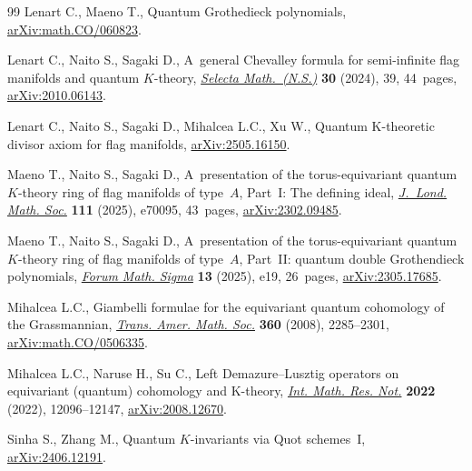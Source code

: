 \documentclass[pdftex]{sigma}
\numberwithin{equation}{section}
\theoremstyle{definition}
\begin{document}
\begin{thebibliography}{99}
Lenart C., Maeno T., Quantum {G}rothedieck polynomials,
 \href{http://arxiv.org/abs/math.CO/060823}{arXiv:math.CO/060823}.

Lenart C., Naito S., Sagaki D., A~general {C}hevalley formula for semi-infinite
 flag manifolds and quantum {$K$}-theory,
 \href{https://doi.org/10.1007/s00029-024-00924-8}{\textit{Selecta
 Math.~(N.S.)}} \textbf{30} (2024), 39, 44~pages,
 \href{http://arxiv.org/abs/2010.06143}{arXiv:2010.06143}.

Lenart C., Naito S., Sagaki D., Mihalcea L.C., Xu W., Quantum {K}-theoretic
 divisor axiom for flag manifolds,
 \href{http://arxiv.org/abs/2505.16150}{arXiv:2505.16150}.

Maeno T., Naito S., Sagaki D., A~presentation of the torus-equivariant quantum
 {$K$}-theory ring of flag manifolds of type~{$A$}, {P}art~{I}: {T}he defining
 ideal, \href{https://doi.org/10.1112/jlms.70095}{\textit{J.~Lond. Math.
 Soc.}} \textbf{111} (2025), e70095, 43~pages,
 \href{http://arxiv.org/abs/2302.09485}{arXiv:2302.09485}.

Maeno T., Naito S., Sagaki D., A~presentation of the torus-equivariant quantum
 {$K$}-theory ring of flag manifolds of type~{$A$}, {P}art~{II}: quantum
 double {G}rothendieck polynomials,
 \href{https://doi.org/10.1017/fms.2024.147}{\textit{Forum Math. Sigma}}
 \textbf{13} (2025), e19, 26~pages,
 \href{http://arxiv.org/abs/2305.17685}{arXiv:2305.17685}.

Mihalcea L.C., Giambelli formulae for the equivariant quantum cohomology of the
 {G}rassmannian,
 \href{https://doi.org/10.1090/S0002-9947-07-04245-6}{\textit{Trans. Amer.
 Math. Soc.}} \textbf{360} (2008), 2285--2301,
 \href{http://arxiv.org/abs/math.CO/0506335}{arXiv:math.CO/0506335}.

Mihalcea L.C., Naruse H., Su C., Left {D}emazure--{L}usztig operators on
 equivariant (quantum) cohomology and {K}-theory,
 \href{https://doi.org/10.1093/imrn/rnab049}{\textit{Int. Math. Res. Not.}}
 \textbf{2022} (2022), 12096--12147,
 \href{http://arxiv.org/abs/2008.12670}{arXiv:2008.12670}.

Sinha S., Zhang M., Quantum $K$-invariants via {Q}uot schemes~{I},
 \href{http://arxiv.org/abs/2406.12191}{arXiv:2406.12191}.

\end{thebibliography}\LastPageEnding
\end{document}
